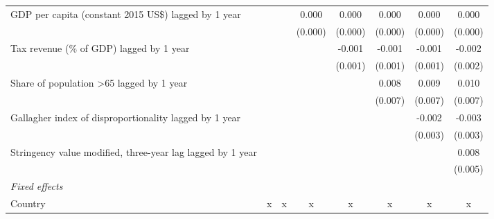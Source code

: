 \begin{tabular}{lccccccc}
   GDP per capita (constant 2015 US\$) lagged by 1 year                                            &              &              & 0.000        & 0.000        & 0.000        & 0.000        & 0.000\\   
                                                                                                   &              &              & (0.000)      & (0.000)      & (0.000)      & (0.000)      & (0.000)\\   
   Tax revenue (\% of GDP) lagged by 1 year                                                        &              &              &              & -0.001       & -0.001       & -0.001       & -0.002\\   
                                                                                                   &              &              &              & (0.001)      & (0.001)      & (0.001)      & (0.002)\\   
   Share of population >65 lagged by 1 year                                                        &              &              &              &              & 0.008        & 0.009        & 0.010\\   
                                                                                                   &              &              &              &              & (0.007)      & (0.007)      & (0.007)\\   
   Gallagher index of disproportionality lagged by 1 year                                          &              &              &              &              &              & -0.002       & -0.003\\   
                                                                                                   &              &              &              &              &              & (0.003)      & (0.003)\\   
   Stringency value modified, three-year lag lagged by 1 year                                      &              &              &              &              &              &              & 0.008\\   
                                                                                                   &              &              &              &              &              &              & (0.005)\\   
   \emph{Fixed effects}\\
   Country                                                                                         & x            & x            & x            & x            & x            & x            & x\\  

\end{tabular}
